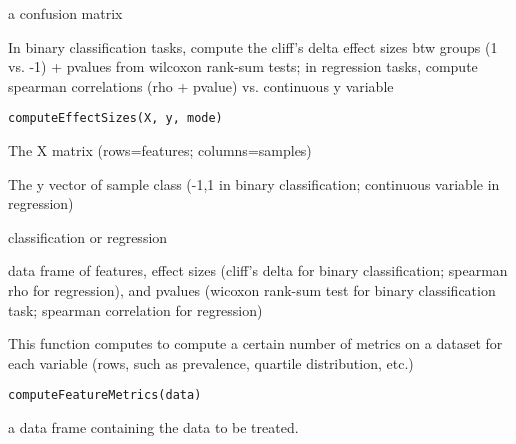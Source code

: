 \documentclass[a4paper]{book}
\begin{document}
%
\begin{Value}
a confusion matrix
\end{Value}
%
\begin{Description}
In binary classification tasks, compute the cliff's delta effect sizes btw groups (1 vs. -1) + pvalues from wilcoxon rank-sum tests; in regression tasks, compute spearman correlations (rho + pvalue) vs. continuous y variable
\end{Description}
%
\begin{Usage}
\begin{verbatim}
computeEffectSizes(X, y, mode)
\end{verbatim}
\end{Usage}
%
\begin{Arguments}
\begin{ldescription}
\item[\code{X}] The X matrix (rows=features; columns=samples)

\item[\code{y}] The y vector of sample class (-1,1 in binary classification; continuous variable in regression)

\item[\code{mode}] classification or regression
\end{ldescription}
\end{Arguments}
%
\begin{Value}
data frame of features, effect sizes (cliff's delta for binary classification; spearman rho for regression), and pvalues (wicoxon rank-sum test for binary classification task; spearman correlation for regression)
\end{Value}
%
\begin{Description}
This function computes to compute a certain number of metrics on a dataset for each variable 
(rows, such as prevalence, quartile distribution, etc.)
\end{Description}
%
\begin{Usage}
\begin{verbatim}
computeFeatureMetrics(data)
\end{verbatim}
\end{Usage}
%
\begin{Arguments}
\begin{ldescription}
\item[\code{data:}] a data frame containing the data to be treated.
\end{ldescription}
\end{Arguments}
\end{document}
